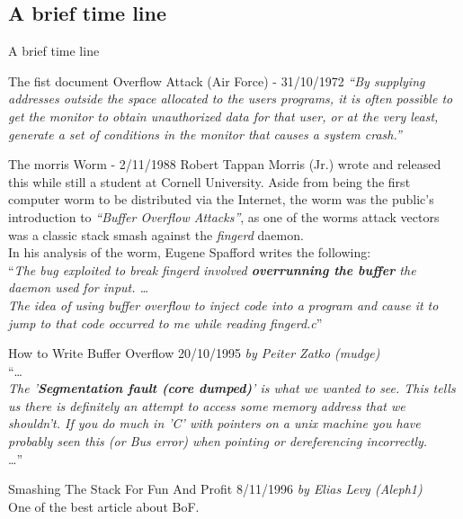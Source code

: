 \subsection{A brief time line}
\begin{frame}{A brief time line}
\begin{block}{The fist document Overflow Attack (Air Force) - 31/10/1972}
\emph{``By supplying addresses outside the space allocated to the users
programs, it is often possible to get the monitor to obtain unauthorized
data for that user, or at the very least, generate a set of conditions in
the monitor that causes a system crash.''}
\end{block}

\framebreak

\begin{block}{The morris Worm - 2/11/1988}
Robert Tappan Morris (Jr.) wrote and released this while still a student at Cornell University. Aside from being the first computer worm to be distributed via the Internet, the worm was the public’s introduction to \emph{``Buffer Overflow Attacks''}, as one of the worms attack vectors was a classic stack smash against the \emph{fingerd} daemon.\\
In his analysis of the worm, Eugene Spafford writes the following:\\
``\emph{The bug exploited to break fingerd involved {\bf overrunning the buffer} the daemon used for input. \ldots \\
The idea of using buffer overflow to inject code into a program and cause it to jump to that code occurred to me while reading fingerd.c}''
\end{block}

\framebreak

\begin{block}{How to Write Buffer Overflow 20/10/1995}
\emph{by Peiter Zatko (mudge)}\\
``\ldots \\
    \emph{The '{\bf Segmentation fault (core dumped)}' is what we wanted to see. This
    tells us there is definitely an attempt to access some memory address
    that we shouldn't. If you do much in 'C' with pointers on a unix
    machine you have probably seen this (or Bus error) when pointing or
    dereferencing incorrectly.}\\
\ldots ''
\end{block}

\begin{block}{Smashing The Stack For Fun And Profit 8/11/1996}
\emph{by Elias Levy (Aleph1)}\\
One of the best article about BoF.
\end{block}

\end{frame}
